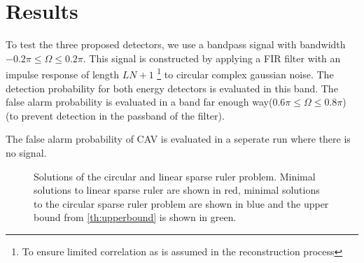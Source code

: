 \documentclass[a4paper, openany, oneside]{memoir}
\begin{document}
\section{Results}

To test the three proposed detectors, we use a bandpass signal with bandwidth $-0.2\pi \leq \Omega \leq 0.2\pi$. This signal is constructed by applying a FIR filter with an impulse response of length $LN+1$ \footnote{To ensure limited correlation as is assumed in the reconstruction process} to circular complex gaussian noise. The detection probability for both energy
detectors is evaluated in this band. The false alarm probability is evaluated in a band far enough way($0.6\pi \leq \Omega \leq 0.8\pi$) (to prevent detection in the passband of the filter).

The false alarm probability of CAV is evaluated in a seperate run where there is no signal.


\begin{figure}[H]
\caption{Solutions of the circular and linear sparse ruler problem. Minimal solutions to linear sparse ruler are shown in red, minimal solutions to the circular sparse ruler problem are shown in blue and the upper bound from \cref{th:upperbound} is shown in green.}\label{fig:comparison_sparse_ruler}
\end{figure}
\end{document}
